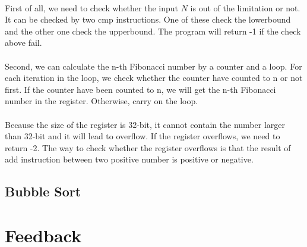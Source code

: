 \paragraph{}
First of all, we need to check whether the input $N$ is out of the limitation or not. It can be checked by two cmp instructions. One of these check the lowerbound and the other one check the upperbound. The program will return -1 if the check above fail.
\paragraph{}
Second, we can calculate the n-th Fibonacci number by a counter and a loop. For each iteration in the loop, we check whether the counter have counted to n or not first. If the counter have been counted to n, we will get the n-th Fibonacci number in the register. Otherwise, carry on the loop.
\paragraph{}
Because the size of the register is 32-bit, it cannot contain the number larger than 32-bit and it will lead to overflow. If the register overflows, we need to return -2. The way to check whether the register overflows is that the result of add instruction between two positive number is positive or negative.
\subsection{Bubble Sort}
\paragraph{}
\section{Feedback}
\paragraph{}
